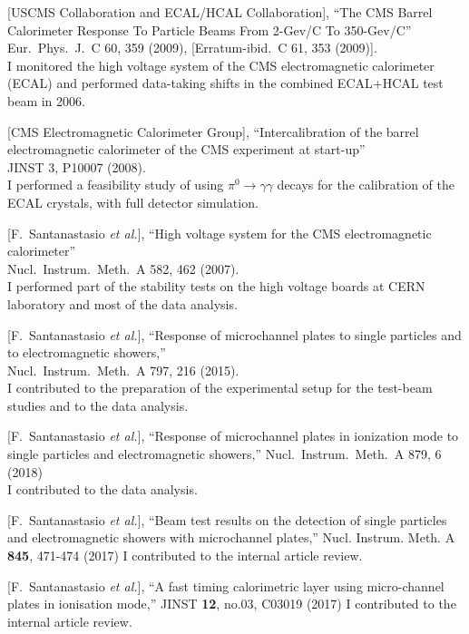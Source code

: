 \documentclass[10pt, a4paper]{article}
\begin{document}
\begin{thebibliography}{599}
[USCMS Collaboration and ECAL/HCAL Collaboration],
``The CMS Barrel Calorimeter Response To Particle Beams From 2-Gev/C To 350-Gev/C''\\
Eur.\ Phys.\ J.\  C 60, 359 (2009), [Erratum-ibid.\  C 61, 353 (2009)].\\
I monitored the high voltage system of the CMS electromagnetic
calorimeter (ECAL) and performed data-taking shifts in the combined ECAL+HCAL test beam in 2006.

[CMS Electromagnetic Calorimeter Group],
``Intercalibration of the barrel electromagnetic calorimeter of the CMS  experiment at start-up''\\
JINST 3, P10007 (2008).
\\ I performed a feasibility study of using $\pi^0 \rightarrow \gamma \gamma$ decays for the calibration of the ECAL crystals, with full detector simulation.

 [F.~Santanastasio {\it et al.}],
``High voltage system for the CMS electromagnetic calorimeter''\\
 Nucl.\ Instrum.\ Meth.\  A 582, 462 (2007).
 \\ I performed part of the stability tests on the high voltage boards at CERN laboratory and most of the data analysis. 

[F.~Santanastasio {\it et al.}],
  ``Response of microchannel plates to single particles and to electromagnetic showers,''\\
Nucl.\ Instrum.\ Meth.\ A 797, 216 (2015).\\
I contributed to the preparation of the experimental setup for the
test-beam studies and to the data analysis.

[F.~Santanastasio {\it et al.}],
  ``Response of microchannel plates in ionization mode to single particles and electromagnetic showers,''
  Nucl.\ Instrum.\ Meth.\ A  879, 6 (2018)\\
I contributed to the data analysis.

[F.~Santanastasio {\it et al.}],
``Beam test results on the detection of single particles and electromagnetic showers with microchannel plates,''
Nucl. Instrum. Meth. A \textbf{845}, 471-474 (2017)
I contributed to the internal article review.

[F.~Santanastasio {\it et al.}],
``A fast timing calorimetric layer using micro-channel plates in ionisation mode,''
JINST \textbf{12}, no.03, C03019 (2017)
I contributed to the internal article review.


\end{thebibliography}
\end{document}
